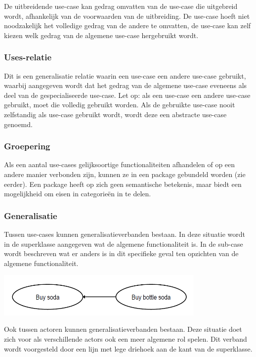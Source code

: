 De uitbreidende use-case kan gedrag omvatten van de use-case die uitgebreid wordt, afhankelijk van de voorwaarden van de uitbreiding. De use-case hoeft niet noodzakelijk het volledige gedrag van de andere te omvatten, de use-case kan zelf kiezen welk gedrag van de algemene use-case hergebruikt wordt.

\subsubsection{Uses-relatie}

Dit is een generalisatie relatie waarin een use-case een andere use-case gebruikt, waarbij aangegeven wordt dat het gedrag van de algemene use-case eveneens als deel van de gespecialiseerde use-case. Let op: als een use-case een andere use-case gebruikt, moet die volledig gebruikt worden. Als de gebruikte use-case nooit zelfstandig als use-case gebruikt wordt, wordt deze een abstracte use-case genoemd.

\subsubsection{Groepering}

Als een aantal use-cases gelijksoortige functionaliteiten afhandelen of op een andere manier verbonden zijn, kunnen ze in een package gebundeld worden (zie eerder).
Een package heeft op zich geen semantische betekenis, maar biedt een mogelijkheid om eisen in categorieën in te delen.

\subsubsection{Generalisatie}
Tussen use-cases kunnen generalisatieverbanden bestaan. In deze situatie wordt in de superklasse aangegeven wat de algemene functionaliteit is. In de sub-case wordt beschreven wat er anders is in dit specifieke geval ten opzichten van de algemene functionaliteit.


\begin{center}
\includegraphics[width=4in]{img/generalisatie}%
\end{center}

Ook tussen actoren kunnen generalisatieverbanden bestaan. Deze situatie doet zich voor als verschillende actors ook een meer algemene rol spelen. Dit verband wordt voorgesteld door een lijn met lege driehoek aan de kant van de superklasse.

